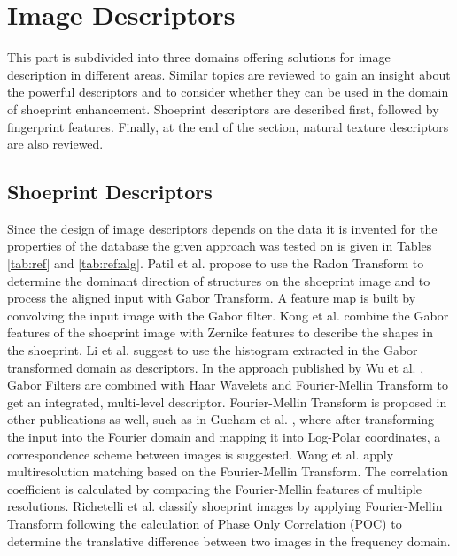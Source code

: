\documentclass[draft,final]{vutinfth} %
\begin{document}
\section{Image Descriptors}

This part is subdivided into three domains offering solutions for image description in different areas.
Similar topics are reviewed to gain an insight about the powerful descriptors and to consider whether they can be used in the domain of shoeprint enhancement.
Shoeprint descriptors are described first, followed by fingerprint features.
Finally, at the end of the section, natural texture descriptors are also reviewed. 

\subsection{Shoeprint Descriptors}
\par
Since the design of image descriptors depends on the data it is invented for the properties of the database the given approach was tested on is given in Tables \ref{tab:ref} and \ref{tab:ref:alg}.
Patil et al. \cite{patil2009rotation} propose to use the Radon Transform to determine the dominant direction of structures on the shoeprint image and to process the aligned input with Gabor Transform.
A feature map is built by convolving the input image with the Gabor filter.
Kong et al.  \cite{kong2014novel} combine the Gabor features of the shoeprint image with Zernike features to describe the shapes in the shoeprint.
Li et al. \cite{li2014retrieval} suggest to use the histogram extracted in the Gabor transformed domain as descriptors.
In the approach published by Wu et al.  \cite{wu2019crime}, Gabor Filters are combined with Haar Wavelets and Fourier-Mellin Transform to get an integrated, multi-level descriptor. 
Fourier-Mellin Transform is proposed in other publications as well, such as in Gueham et al. \cite{gueham2008automatic}, where after transforming the input into the Fourier domain and mapping it into Log-Polar coordinates, a correspondence scheme between images is suggested.
Wang et al. \cite{wang2014automatic} apply multiresolution matching based on the Fourier-Mellin Transform.
The correlation coefficient is calculated by comparing the Fourier-Mellin features of multiple resolutions.
Richetelli et al. \cite{richetelli2017classification} classify shoeprint images by applying Fourier-Mellin Transform following the calculation of Phase Only Correlation (POC) to determine the translative difference between two images in the frequency domain.
\end{document}
